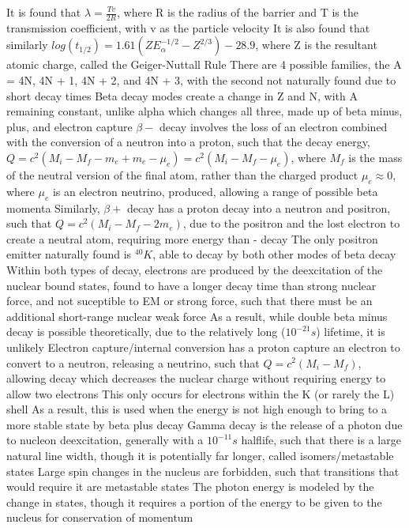\documentclass[11 pt, twoside]{article}
\newenvironment{outline*}
{
	\begin{outline}[enumerate]
	}
	{\end{outline}
}
\begin{document}
\begin{outline*}
		\3 It is found that $\lambda = \frac{Tv}{2R}$, where R is the radius of the barrier and T is the transmission coefficient, with v as the particle velocity
			\4 It is also found that similarly $log(t_{1/2}) = 1.61(ZE_{\alpha}^{-1/2} - Z^{2/3}) - 28.9$, where Z is the resultant atomic charge, called the Geiger-Nuttall Rule
		\3 There are 4 possible families, the A = 4N, 4N + 1, 4N + 2, and 4N + 3, with the second not naturally found due to short decay times
	\2 Beta decay modes create a change in Z and N, with A remaining constant, unlike alpha which changes all three, made up of beta minus, plus, and electron capture
		\3 $\beta -$ decay involves the loss of an electron combined with the conversion of a neutron into a proton, such that the decay energy, $Q = c^2(M_i - M_f - m_e + m_e - \mu_e) = c^2(M_i - M_f - \mu_e)$, where $M_f$ is the mass of the neutral version of the final atom, rather than the charged product
			\4 $\mu_e \approx 0$, where $\mu_e$ is an electron neutrino, produced, allowing a range of possible beta momenta
		\3 Similarly, $\beta +$ decay has a proton decay into a neutron and positron, such that $Q = c^2(M_i - M_f - 2m_e)$, due to the positron and the lost electron to create a neutral atom, requiring more energy than - decay
			\4 The only positron emitter naturally found is $^{40}K$, able to decay by both other modes of beta decay
		\3 Within both types of decay, electrons are produced by the deexcitation of the nuclear bound states, found to have a longer decay time than strong nuclear force, and not suceptible to EM or strong force, such that there must be an additional short-range nuclear weak force
			\4 As a result, while double beta minus decay is possible theoretically, due to the relatively long ($10^{-21} s$) lifetime, it is unlikely
		\3 Electron capture/internal conversion has a proton capture an electron to convert to a neutron, releasing a neutrino, such that $Q = c^2(M_i - M_f)$, allowing decay which decreases the nuclear charge without requiring energy to allow two electrons
			\4 This only occurs for electrons within the K (or rarely the L) shell
			\4 As a result, this is used when the energy is not high enough to bring to a more stable state by beta plus decay
	\2 Gamma decay is the release of a photon due to nucleon deexcitation, generally with a $10^{-11} s$ halflife, such that there is a large natural line width, though it is potentially far longer, called isomers/metastable states
		\3 Large spin changes in the nucleus are forbidden, such that transitions that would require it are metastable states
		\3 The photon energy is modeled by the change in states, though it requires a portion of the energy to be given to the nucleus for conservation of momentum

\end{outline*}
\end{document}
